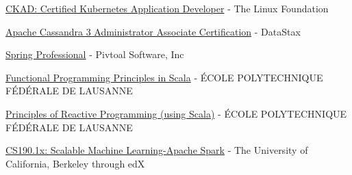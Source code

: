 \begin{cvitems}
\sectionspace
\sectionspace
\vspace{1mm}
	\fontsize{11pt}{1.4em}\bodyfontlight\upshape\color{text}
        \item {\href{https://www.credly.com/badges/1970a882-de77-4c30-9704-88b4a052ecff/linked_in_profile}{CKAD: Certified Kubernetes Application Developer}} - {The Linux Foundation}
        \item {\href{https://certification.mettl.com/datastax/applicant/verify-certification-with-qr?email=mohanmca%40gmail.com&assessment=Apache%20Cassandra%203%20Administrator%20Associate%20Certification&date=Jul%2031,%202021}{Apache Cassandra 3 Administrator Associate Certification}} - {DataStax}
        \item {\href{https://bcert.me/bc/html/show-badge.html?b=gfcjzxzu}{Spring Professional}} - {Pivtoal Software, Inc}
        \item {\href{https://www.coursera.org/account/accomplishments/certificate/MVD9BHZ3V6}{Functional Programming Principles in Scala}} - {ÉCOLE POLYTECHNIQUE FÉDÉRALE DE LAUSANNE}
        \item {\href{https://www.coursera.org/account/accomplishments/verify/USHJQZYKSQ}{Principles of Reactive Programming (using Scala)}} - {ÉCOLE POLYTECHNIQUE FÉDÉRALE DE LAUSANNE}
        \item {\href{https://verify.edx.org/cert/92169a42642b43e9afe117dd761e6c4f}{CS190.1x: Scalable Machine Learning-Apache Spark}} - {The University of California, Berkeley through edX}        
    \end{cvitems}
\vspace{1mm}
\sectionspace